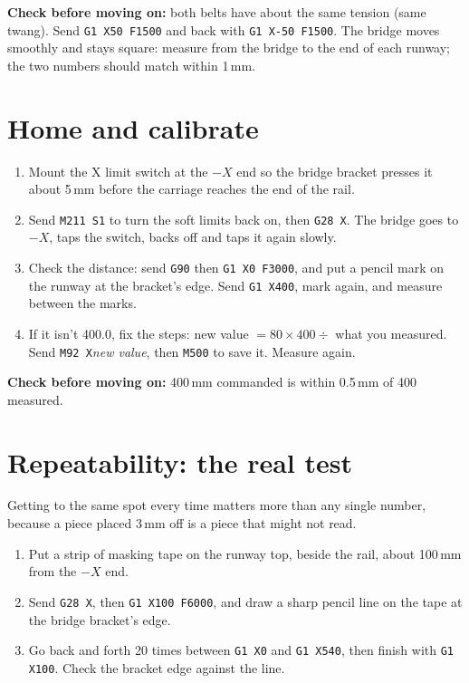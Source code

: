 \documentclass[10pt]{article}
\newcommand{\mm}{\,mm}
\newcommand{\gcode}[1]{\texttt{#1}}
\newcommand{\gate}[1]{\par\smallskip\noindent\colorbox{okgreen!10}{\parbox{\dimexpr\linewidth-2\fboxsep}{\textcolor{okgreen}{\textbf{Check before moving on:}} #1}}\par\smallskip}
\begin{document}
\gate{both belts have about the same tension (same twang). Send \gcode{G1 X50 F1500} and back
with \gcode{G1 X-50 F1500}. The bridge moves smoothly and stays square: measure from the bridge to
the end of each runway; the two numbers should match within 1\mm.}

\section{Home and calibrate}

\begin{enumerate}
  \item Mount the X limit switch at the $-X$ end so the bridge bracket presses it about 5\mm{}
        before the carriage reaches the end of the rail.
  \item Send \gcode{M211 S1} to turn the soft limits back on, then \gcode{G28 X}. The bridge goes
        to $-X$, taps the switch, backs off and taps it again slowly.
  \item Check the distance: send \gcode{G90} then \gcode{G1 X0 F3000}, and put a pencil mark on
        the runway at the bracket's edge. Send \gcode{G1 X400}, mark again, and measure between
        the marks.
  \item If it isn't 400.0, fix the steps: new value $= 80 \times 400 \div$ what you measured.
        Send \gcode{M92 X}\textit{new value}, then \gcode{M500} to save it. Measure again.
\end{enumerate}

\gate{400\mm{} commanded is within 0.5\mm{} of 400 measured.}

\section{Repeatability: the real test}

Getting to the same spot every time matters more than any single number, because a piece placed
3\mm{} off is a piece that might not read.

\begin{enumerate}
  \item Put a strip of masking tape on the runway top, beside the rail, about 100\mm{} from the
        $-X$ end.
  \item Send \gcode{G28 X}, then \gcode{G1 X100 F6000}, and draw a sharp pencil line on the tape
        at the bridge bracket's edge.
  \item Go back and forth 20 times between \gcode{G1 X0} and \gcode{G1 X540}, then finish with
        \gcode{G1 X100}. Check the bracket edge against the line.
\end{enumerate}
\end{document}
